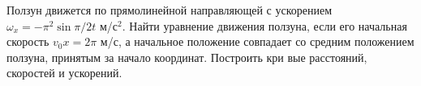 Ползун движется по прямолинейной направляющей с ускорением $\omega_x=
-\pi^2 \sin\pi/2t$ м/с$^2$. Найти уравнение движения ползуна, если его 
начальная скорость $v_0x=2\pi$ м/с, а начальное положение совпадает со 
средним положением ползуна, принятым за начало координат. Построить кри
вые расстояний, скоростей и ускорений.

